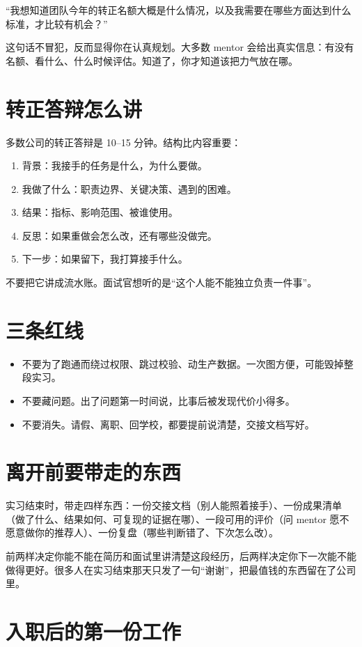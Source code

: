 \documentclass[UTF8,zihao=5,openany]{ctexbook}
\begin{document}
“我想知道团队今年的转正名额大概是什么情况，以及我需要在哪些方面达到什么标准，才比较有机会？”

这句话不冒犯，反而显得你在认真规划。大多数 mentor 会给出真实信息：有没有名额、看什么、什么时候评估。知道了，你才知道该把力气放在哪。

\section{转正答辩怎么讲}
多数公司的转正答辩是 10--15 分钟。结构比内容重要：

\begin{enumerate}
\item 背景：我接手的任务是什么，为什么要做。
\item 我做了什么：职责边界、关键决策、遇到的困难。
\item 结果：指标、影响范围、被谁使用。
\item 反思：如果重做会怎么改，还有哪些没做完。
\item 下一步：如果留下，我打算接手什么。
\end{enumerate}

不要把它讲成流水账。面试官想听的是“这个人能不能独立负责一件事”。

\section{三条红线}
\begin{itemize}
\item 不要为了跑通而绕过权限、跳过校验、动生产数据。一次图方便，可能毁掉整段实习。
\item 不要藏问题。出了问题第一时间说，比事后被发现代价小得多。
\item 不要消失。请假、离职、回学校，都要提前说清楚，交接文档写好。
\end{itemize}

\section{离开前要带走的东西}
实习结束时，带走四样东西：一份交接文档（别人能照着接手）、一份成果清单（做了什么、结果如何、可复现的证据在哪）、一段可用的评价（问 mentor 愿不愿意做你的推荐人）、一份复盘（哪些判断错了、下次怎么改）。

前两样决定你能不能在简历和面试里讲清楚这段经历，后两样决定你下一次能不能做得更好。很多人在实习结束那天只发了一句“谢谢”，把最值钱的东西留在了公司里。


\section{入职后的第一份工作}
\end{document}
